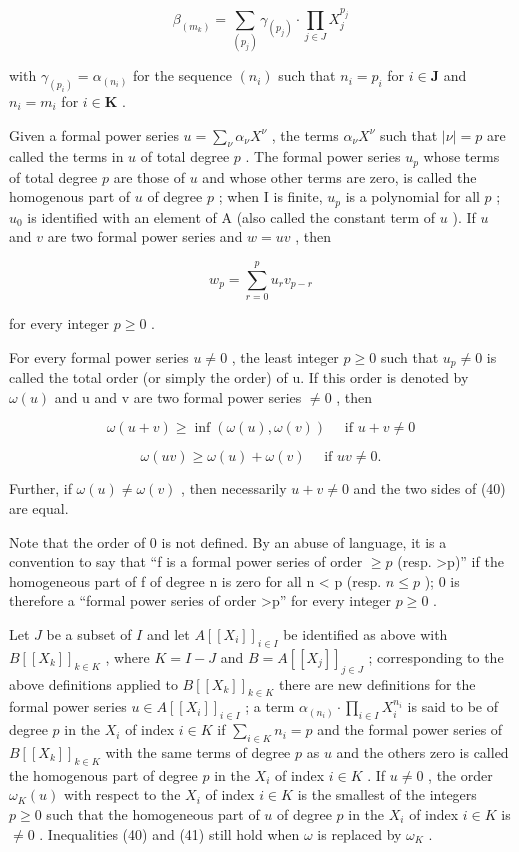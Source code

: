 \[
\beta_ {(m _ {k})} = \sum_ {(p _ {j})} \gamma_ {(p _ {j})} \cdot \prod_ {j \in J} X _ {j} ^ {p _ {j}}
\]

with \(\gamma_{(p_i)} = \alpha_{(n_i)}\) for the sequence \((n_i)\) such that \(n_i = p_i\) for \(i \in \mathbf{J}\) and \(n_i = m_i\) for \(i \in \mathbf{K}\) .

Given a formal power series \(u = \sum_{\nu} \alpha_{\nu} X^{\nu}\) , the terms \(\alpha_{\nu} X^{\nu}\) such that \(|\nu| = p\) are called the terms in \(u\) of total degree \(p\) . The formal power series \(u_p\) whose terms of total degree \(p\) are those of \(u\) and whose other terms are zero, is called the homogenous part of \(u\) of degree \(p\) ; when I is finite, \(u_p\) is a polynomial for all \(p\) ; \(u_0\) is identified with an element of A (also called the constant term of \(u\) ). If \(u\) and \(v\) are two formal power series and \(w = uv\) , then

\[
w _ {p} = \sum_ {r = 0} ^ {p} u _ {r} v _ {p - r}\tag{39}
\]

for every integer \(p \geqslant 0\) .

For every formal power series \(u \neq 0\) , the least integer \(p \geqslant 0\) such that \(u_{p} \neq 0\) is called the total order (or simply the order) of u. If this order is denoted by \(\omega(u)\) and u and v are two formal power series \(\neq 0\) , then

\[
\omega (u + v) \geqslant \inf (\omega (u), \omega (v)) \quad \text { if } u + v \neq 0\tag{40}
\]

\[
\omega (u v) \geqslant \omega (u) + \omega (v) \quad \text { if } u v \neq 0.\tag{41}
\]

Further, if \(\omega(u) \neq \omega(v)\) , then necessarily \(u + v \neq 0\) and the two sides of (40) are equal.

Note that the order of 0 is not defined. By an abuse of language, it is a convention to say that ``f is a formal power series of order \(\geqslant p\) (resp. \textgreater p)'' if the homogeneous part of f of degree n is zero for all n \textless{} p (resp. \(n \leqslant p\) ); 0 is therefore a ``formal power series of order \textgreater p'' for every integer \(p \geqslant 0\) .

Let \(J\) be a subset of \(I\) and let \(A[[X_i]]_{i \in I}\) be identified as above with \(B[[X_k]]_{k \in K}\) , where \(K = I - J\) and \(B = A[[X_j]]_{j \in J}\) ; corresponding to the above definitions applied to \(B[[X_k]]_{k \in K}\) there are new definitions for the formal power series \(u \in A[[X_i]]_{i \in I}\) ; a term \(\alpha_{(n_i)} \cdot \prod_{i \in I} X_i^{n_i}\) is said to be of degree \(p\) in the \(X_i\) of index \(i \in K\) if \(\sum_{i \in K} n_i = p\) and the formal power series of \(B[[X_k]]_{k \in K}\) with the same terms of degree \(p\) as \(u\) and the others zero is called the homogenous part of degree \(p\) in the \(X_i\) of index \(i \in K\) . If \(u \neq 0\) , the order \(\omega_K(u)\) with respect to the \(X_i\) of index \(i \in K\) is the smallest of the integers \(p \geqslant 0\) such that the homogeneous part of \(u\) of degree \(p\) in the \(X_i\) of index \(i \in K\) is \(\neq 0\) . Inequalities (40) and (41) still hold when \(\omega\) is replaced by \(\omega_K\) .

